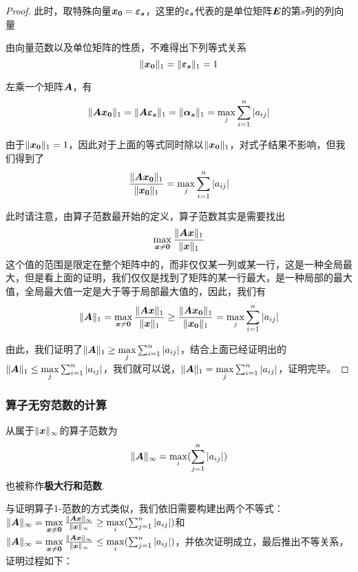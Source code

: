 \documentclass[12pt, a4paper, oneside, UTF8]{ctexbook}
\begin{document}
\begin{proof}
    此时，取特殊向量$\boldsymbol{x_0}=\boldsymbol{\varepsilon_s}$，这里的$\boldsymbol{\varepsilon_s}$代表的是单位矩阵$\boldsymbol{E}$的第$s$列的列向量

    由向量范数以及单位矩阵的性质，不难得出下列等式关系\[\Vert\boldsymbol{x_0}\Vert_1=\Vert\boldsymbol{\varepsilon_s}\Vert_1=1\]

    左乘一个矩阵$\boldsymbol{A}$，有\[\Vert\boldsymbol{Ax_0}\Vert_1=\Vert\boldsymbol{A\varepsilon_s}\Vert_1=\Vert\boldsymbol{\alpha_s}\Vert_1=\max\limits_j\sum_{i=1}^{n}|a_{ij}|\]

    由于$\Vert\boldsymbol{x_0}\Vert_1=1$，因此对于上面的等式同时除以$\Vert\boldsymbol{x_0}\Vert_1$，对式子结果不影响，但我们得到了\[\frac{\Vert\boldsymbol{Ax_0}\Vert_1}{\Vert\boldsymbol{x_0}\Vert_1}=\max\limits_j\sum_{i=1}^{n}|a_{ij}|\]

    此时请注意，由算子范数最开始的定义，算子范数其实是需要找出\[\max\limits_{\boldsymbol{x}\neq\boldsymbol{0}}\frac{\Vert\boldsymbol{Ax}\Vert_1}{\Vert\boldsymbol{x}\Vert_1}\]
    这个值的范围是限定在整个矩阵中的，而非仅仅某一列或某一行，这是一种全局最大，但是看上面的证明，我们仅仅是找到了矩阵的某一行最大，是一种局部的最大值，全局最大值一定是大于等于局部最大值的，因此，我们有\[\Vert\boldsymbol{A}\Vert_1=\max\limits_{\boldsymbol{x}\neq\boldsymbol{0}}\frac{\Vert\boldsymbol{Ax}\Vert_1}{\Vert\boldsymbol{x}\Vert_1}\geq\frac{\Vert\boldsymbol{Ax_0}\Vert_1}{\Vert\boldsymbol{x_0}\Vert_1}=\max\limits_j\sum_{i=1}^{n}|a_{ij}|\]

    由此，我们证明了$\Vert\boldsymbol{A}\Vert_1\geq\max\limits_{j}\sum_{i=1}^{n}|a_{ij}|$，结合上面已经证明出的$\Vert\boldsymbol{A}\Vert_1\leq\max\limits_{j}\sum_{i=1}^{n}|a_{ij}|$，我们就可以说，$\Vert\boldsymbol{A}\Vert_1=\max\limits_{j}\sum_{i=1}^{n}|a_{ij}|$，证明完毕。

\end{proof}

\subsubsection{算子无穷范数的计算}
从属于$\Vert\boldsymbol{x}\Vert_{\infty}$的算子范数为\[\Vert\boldsymbol{A}\Vert_{\infty}=\max\limits_{i}(\sum_{j=1}^{n}|a_{ij}|)\]
也被称作\textbf{极大行和范数}.

与证明算子1-范数的方式类似，我们依旧需要构建出两个不等式：$\Vert\boldsymbol{A}\Vert_{\infty}=\max\limits_{\boldsymbol{x}\neq\boldsymbol{0}}\frac{\Vert\boldsymbol{Ax}\Vert_{\infty}}{\Vert\boldsymbol{x}\Vert_{\infty}}\geq\max\limits_{i}(\sum_{j=1}^{n}|a_{ij}|)$和$\Vert\boldsymbol{A}\Vert_{\infty}=\max\limits_{\boldsymbol{x}\neq\boldsymbol{0}}\frac{\Vert\boldsymbol{Ax}\Vert_{\infty}}{\Vert\boldsymbol{x}\Vert_{\infty}}\leq\max\limits_{i}(\sum_{j=1}^{n}|a_{ij}|)$，并依次证明成立，最后推出不等关系，证明过程如下：
\end{document}
